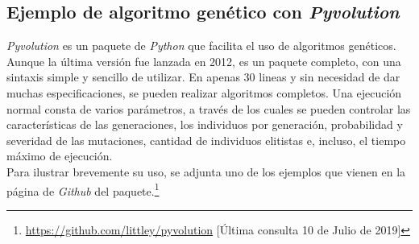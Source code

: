 		\subsection{Ejemplo de algoritmo gen\'etico con \textit{Pyvolution}}
		
		\textit{Pyvolution} es un paquete de \textit{Python} que facilita el uso de algoritmos gen\'eticos. Aunque la \'ultima versi\'on fue lanzada en 2012, es un paquete completo, con una sintaxis simple y sencillo de utilizar. En apenas 30 lineas y sin necesidad de dar muchas especificaciones, se pueden realizar algoritmos completos. Una ejecuci\'on normal consta de varios par\'ametros, a trav\'es de los cuales se pueden controlar las caracter\'isticas de las generaciones, los individuos por generaci\'on, probabilidad y severidad de las mutaciones, cantidad de individuos elitistas e, incluso, el tiempo m\'aximo de ejecuci\'on.\\
		
		Para ilustrar brevemente su uso, se adjunta uno de los ejemplos que vienen en la p\'agina de \textit{Github} del paquete.\footnote{\url{https://github.com/littley/pyvolution} [\'Ultima consulta 10 de Julio de 2019]}\\
		
